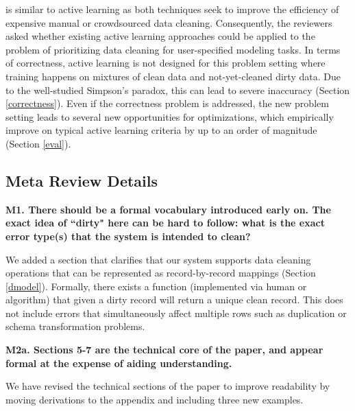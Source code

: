 \sys is similar to active learning as both techniques seek to improve the efficiency of expensive manual or crowdsourced data cleaning.
Consequently, the reviewers asked whether existing active learning approaches could be applied to the problem of prioritizing data cleaning for user-specified modeling tasks. 
In terms of correctness, active learning is not designed for this problem setting where training happens on mixtures of clean data and not-yet-cleaned dirty data.
Due to the well-studied Simpson's paradox, this can lead to severe inaccuracy (Section \ref{correctness}).
Even if the correctness problem is addressed, the new problem setting leads to several new opportunities for optimizations, which empirically improve on typical active learning criteria by up to an order of magnitude (Section \ref{eval}).

\vspace{0.5em}

\subsection*{Meta Review Details} 

\noindent\noindent \textbf{M1. There should be a formal vocabulary introduced early on. The exact idea of ``dirty" here can be hard to follow: what is the exact error type(s) that the system is intended to clean?}

\vspace{0.5em}

We added a section that clarifies that our system supports data cleaning operations that can be represented as record-by-record mappings (Section \ref{dmodel}).
Formally, there exists a function (implemented via human or algorithm) that given a dirty record will return a unique clean record.
This does not include errors that simultaneously affect multiple rows such as duplication or schema transformation problems.

\vspace{0.5em}

\noindent\textbf{M2a. Sections 5-7 are the technical core of the paper, and appear formal at the expense of aiding understanding.}

We have revised the technical sections of the paper to improve readability by moving derivations to the appendix and including three new examples.

\vspace{0.5em}

